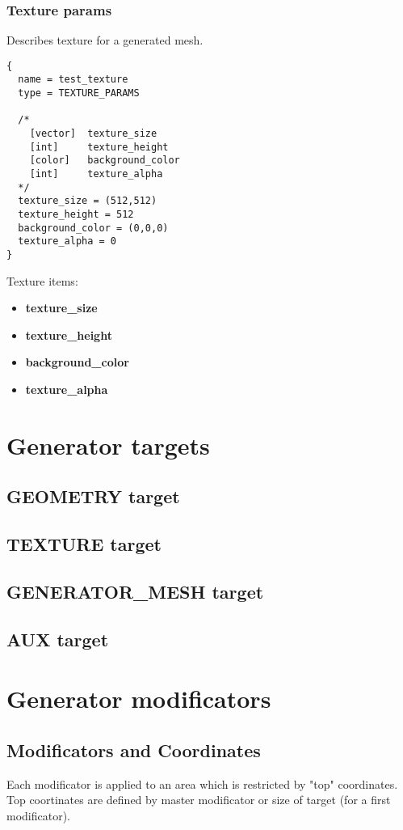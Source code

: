 \documentclass[9pt]{article}
\begin{document}
\subsubsection{Texture params}
Describes texture for a generated mesh.
\begin{verbatim}
{
  name = test_texture
  type = TEXTURE_PARAMS

  /*
    [vector]  texture_size
    [int]     texture_height
    [color]   background_color
    [int]     texture_alpha
  */
  texture_size = (512,512)  
  texture_height = 512
  background_color = (0,0,0)
  texture_alpha = 0
}
\end{verbatim}
Texture items:
\begin{itemize}
\item{\bf texture\_size}
\item{\bf texture\_height}
\item{\bf background\_color}
\item{\bf texture\_alpha}
\end{itemize}

\section{Generator targets}
\subsection{GEOMETRY target}
\subsection{TEXTURE target}
\subsection{GENERATOR\_MESH target}
\subsection{AUX target}

\section{Generator modificators}

\subsection{Modificators and Coordinates}
Each modificator is applied to an area which is restricted by "top" coordinates. 
Top coortinates are defined by master modificator or size of target 
(for a first modificator).
\end{document}
